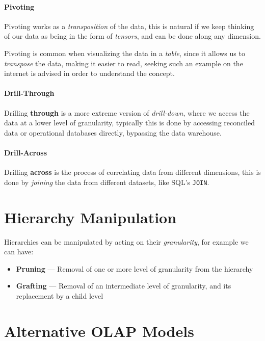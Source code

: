 \documentclass[openright, twoside, twocolumn, a4paper, 10pt]{report}
\begin{document}
\paragraph{Pivoting}
Pivoting works as a \emph{transposition} of the data, this is natural if we keep thinking
of our data as being in the form of \emph{tensors}, and can be done along any dimension.

Pivoting is common when visualizing the data in a \emph{table}, since it allows us to
\emph{transpose} the data, making it easier to read, seeking such an example
on the internet is advised in order to understand the concept.

\paragraph{Drill-Through}
Drilling \textbf{through} is a more extreme version of \emph{drill-down}, where we
access the data at a lower level of granularity, typically this is done by
accessing reconciled data or operational databases directly, bypassing the data
warehouse.

\paragraph{Drill-Across}

Drilling \textbf{across} is the process of correlating data from different dimensions,
this is done by \emph{joining} the data from different datasets, like SQL's \texttt{JOIN}.

\section{Hierarchy Manipulation}

Hierarchies can be manipulated by acting on their \emph{granularity}, for
example we can have:

\begin{itemize}
	\item \textbf{Pruning} --- Removal of one or more level of granularity from the hierarchy
	\item \textbf{Grafting} --- Removal of an intermediate level of granularity,
	      and its replacement by a child level
\end{itemize}

\section{Alternative OLAP Models}
\end{document}
